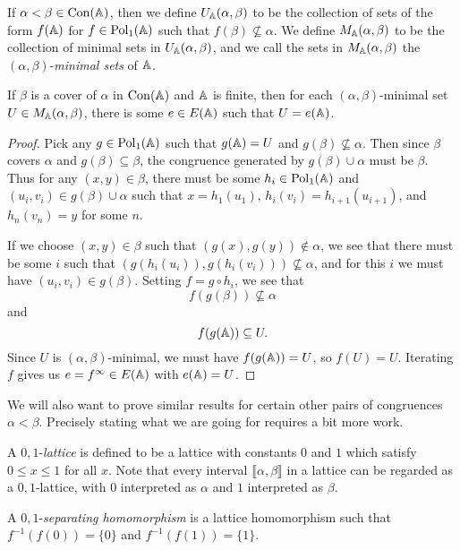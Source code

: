 \begin{appendices}
\begin{defn} If $\alpha < \beta \in \operatorname{Con}(\mathbb{A})$, then we define $U_{\mathbb{A}}(\alpha, \beta)$ to be the collection of sets of the form $f(\mathbb{A})$ for $f \in \operatorname{Pol}_1(\mathbb{A})$ such that $f(\beta) \not\subseteq \alpha$. We define $M_{\mathbb{A}}(\alpha, \beta)$ to be the collection of minimal sets in $U_{\mathbb{A}}(\alpha, \beta)$, and we call the sets in $M_{\mathbb{A}}(\alpha, \beta)$ the $(\alpha, \beta)$-\emph{minimal sets} of $\mathbb{A}$.
\end{defn}

\begin{prop}\label{prop-prime-tame} If $\beta$ is a cover of $\alpha$ in $\operatorname{Con}(\mathbb{A})$ and $\mathbb{A}$ is finite, then for each $(\alpha,\beta)$-minimal set $U \in M_{\mathbb{A}}(\alpha,\beta)$, there is some $e \in E(\mathbb{A})$ such that $U = e(\mathbb{A})$.
\end{prop}
\begin{proof} Pick any $g \in \operatorname{Pol}_1(\mathbb{A})$ such that $g(\mathbb{A}) = U$ and $g(\beta) \not\subseteq \alpha$. Then since $\beta$ covers $\alpha$ and $g(\beta) \subseteq \beta$, the congruence generated by $g(\beta) \cup \alpha$ must be $\beta$. Thus for any $(x,y) \in \beta$, there must be some $h_i \in \operatorname{Pol}_1(\mathbb{A})$ and $(u_i,v_i) \in g(\beta) \cup \alpha$ such that $x = h_1(u_1)$, $h_i(v_i) = h_{i+1}(u_{i+1})$, and $h_n(v_n) = y$ for some $n$.

If we choose $(x,y) \in \beta$ such that $(g(x),g(y)) \not\in \alpha$, we see that there must be some $i$ such that $(g(h_i(u_i)), g(h_i(v_i))) \not\subseteq \alpha$, and for this $i$ we must have $(u_i,v_i) \in g(\beta)$. Setting $f = g\circ h_i$, we see that
\[
f(g(\beta)) \not\subseteq \alpha
\]
and
\[
f(g(\mathbb{A})) \subseteq U.
\]
Since $U$ is $(\alpha,\beta)$-minimal, we must have $f(g(\mathbb{A})) = U$, so $f(U) = U$. Iterating $f$ gives us $e = f^{\infty} \in E(\mathbb{A})$ with $e(\mathbb{A}) = U$.
\end{proof}

We will also want to prove similar results for certain other pairs of congruences $\alpha < \beta$. Precisely stating what we are going for requires a bit more work.

\begin{defn} A $0,1$-\emph{lattice} is defined to be a lattice with constants $0$ and $1$ which satisfy $0 \le x \le 1$ for all $x$. Note that every interval $\llbracket \alpha, \beta \rrbracket$ in a lattice can be regarded as a $0,1$-lattice, with $0$ interpreted as $\alpha$ and $1$ interpreted as $\beta$.

A $0,1$-\emph{separating homomorphism} is a lattice homomorphism such that $f^{-1}(f(0)) = \{0\}$ and $f^{-1}(f(1)) = \{1\}$.
\end{defn}


\end{appendices}
